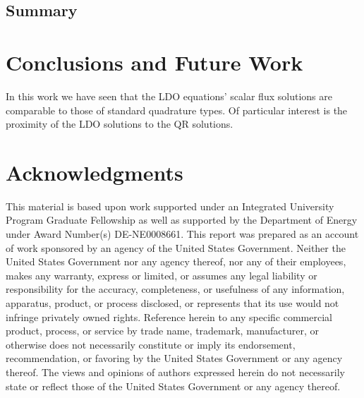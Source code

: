 \documentclass{article} %
\begin{document}
\subsection{Summary}

\section{Conclusions and Future Work}
\label{sec:conclusions}

In this work we have seen that the LDO equations' scalar flux solutions are
comparable to those of standard quadrature types. Of particular interest is
the proximity of the LDO solutions to the QR solutions.

\pagebreak
\section*{Acknowledgments}

This material is based upon work supported under an Integrated
University Program Graduate Fellowship as well as supported by the Department 
of Energy under Award Number(s) DE-NE0008661. This report was prepared as an
account of work sponsored by an agency of the United States Government.
Neither the United States Government nor any agency thereof, nor any of their
employees, makes any warranty, express or limited, or assumes any legal
liability or responsibility for the accuracy, completeness, or usefulness of
any information, apparatus, product, or process disclosed, or represents that
its use would not infringe privately owned rights. Reference herein to any 
specific commercial product, process, or service by trade name, trademark, 
manufacturer, or otherwise does not necessarily constitute or imply its 
endorsement, recommendation, or favoring by the United States Government or
any agency thereof. The views and opinions of authors expressed herein do not 
necessarily state or reflect those of the United States Government or any 
agency thereof.

\pagebreak



\end{document}
